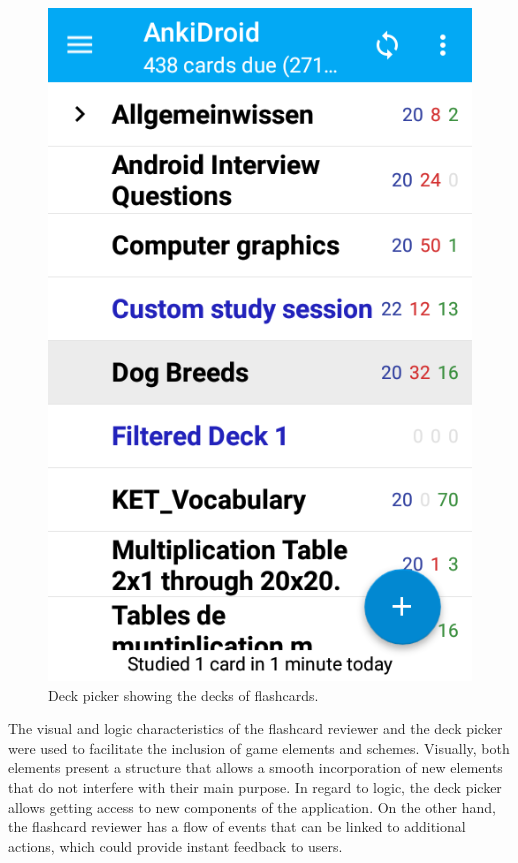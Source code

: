 \begin{figure}[htb]
    \vskip 5mm
        \begin{center}
            \includegraphics[scale=0.4]{./Figures/picker.png}
            \caption{Deck picker showing the decks of flashcards.}
            \label{fig:deck-picker}
        \end{center}
    \vskip -5mm
\end{figure}

The visual and logic characteristics of the flashcard reviewer and the deck picker were used to facilitate the inclusion of game elements and schemes. Visually, both elements present a structure that allows a smooth incorporation of new elements that do not interfere with their main purpose. In regard to logic, the deck picker allows getting access to new components of the application. On the other hand, the flashcard reviewer has a flow of events that can be linked to additional actions, which could provide instant feedback to users.


